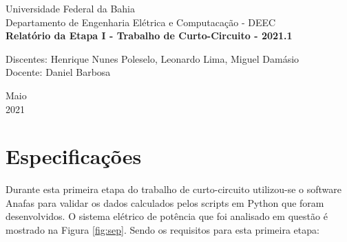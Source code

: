 \documentclass[a4paper, 12pt]{article}
\begin{document}

\begin{titlepage}
	\begin{center}
	

		\Huge{Universidade Federal da Bahia}\\
		\large{Departamento de Engenharia Elétrica e Computacação - DEEC}\\ 
		\vspace{15pt}
        \vspace{95pt}
        \textbf{\LARGE{Relatório da Etapa I - Trabalho de Curto-Circuito - 2021.1  }}\\
		\vspace{3,5cm}
	\end{center}
	
	\begin{flushleft}
		\begin{tabbing}
			Discentes: Henrique Nunes Poleselo, Leonardo Lima, Miguel Damásio\\

			Docente: Daniel Barbosa \\
	\end{tabbing}
 \end{flushleft}
	\vspace{1cm}
	
	\begin{center}
		\vspace{\fill}
			 Maio\\
		 2021
			\end{center}
\end{titlepage}

\newpage
\tableofcontents
\thispagestyle{empty}

\newpage
{}


\section{Especificações}
Durante esta primeira etapa do trabalho de curto-circuito utilizou-se o software Anafas para validar os dados calculados pelos
scripts em Python que foram desenvolvidos. O sistema elétrico de potência que foi analisado em questão é mostrado na Figura \ref{fig:sep}. Sendo os requisitos para esta primeira etapa:
\end{document}
